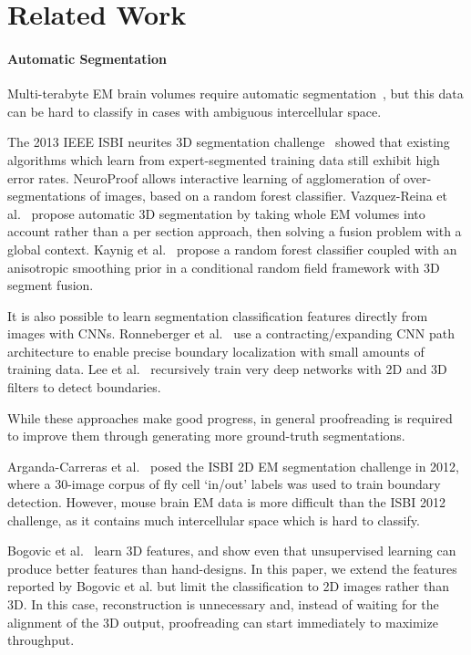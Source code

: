 \section{Related Work}

\paragraph{Automatic Segmentation}

Multi-terabyte EM brain volumes require automatic segmentation~\cite{jain2010,kaynig10,Liu2014,NunezIglesias2013Machine,GALA2014,amelio_segmentation}, but this data can be hard to classify in cases with ambiguous intercellular space. 

The 2013 IEEE ISBI neurites 3D segmentation challenge~\cite{isbi_challenge} showed that existing algorithms which learn from expert-segmented training data still exhibit high error rates. NeuroProof \cite{neuroproof2013} allows interactive learning of agglomeration of over-segmentations of images, based on a random forest classifier. Vazquez-Reina et al.~\cite{amelio_segmentation} propose automatic 3D segmentation by taking whole EM volumes into account rather than a per section approach, then solving a fusion problem with a global context. Kaynig et al.~\cite{kaynig10} propose a random forest classifier coupled with an anisotropic smoothing prior in a conditional random field framework with 3D segment fusion. 

It is also possible to learn segmentation classification features directly from images with CNNs. Ronneberger et al.~\cite{RonnebergerFB15} use a contracting/expanding CNN path architecture to enable precise boundary localization with small amounts of training data. Lee et al.~\cite{lee2015recursive} recursively train very deep networks with 2D and 3D filters to detect boundaries. 

While these approaches make good progress, in general proofreading is required to improve them through generating more ground-truth segmentations.

Arganda-Carreras et al.~\cite{10.3389/fnana.2015.00142} posed the ISBI 2D EM segmentation challenge in 2012, where a 30-image corpus of fly cell `in/out' labels was used to train boundary detection. However, mouse brain EM data is more difficult than the ISBI 2012 challenge, as it contains much intercellular space which is hard to classify. 

Bogovic et al.~\cite{BogovicHJ13} learn 3D features, and show even that unsupervised learning can produce better features than hand-designs. In this paper, we extend the features reported by Bogovic et al. but limit the classification to 2D images rather than 3D. In this case, reconstruction is unnecessary and, instead of waiting for the alignment of the 3D output, proofreading can start immediately to maximize throughput.


